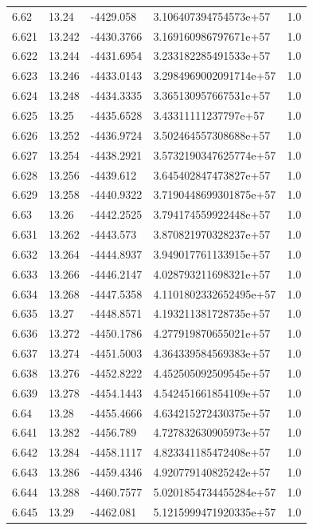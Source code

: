 \begin{tabular}{lllll}
6.62 & 13.24 & -4429.058 & 3.106407394754573e+57 & 1.0 \\
6.621 & 13.242 & -4430.3766 & 3.169160986797671e+57 & 1.0 \\
6.622 & 13.244 & -4431.6954 & 3.233182285491533e+57 & 1.0 \\
6.623 & 13.246 & -4433.0143 & 3.2984969002091714e+57 & 1.0 \\
6.624 & 13.248 & -4434.3335 & 3.365130957667531e+57 & 1.0 \\
6.625 & 13.25 & -4435.6528 & 3.43311111237797e+57 & 1.0 \\
6.626 & 13.252 & -4436.9724 & 3.502464557308688e+57 & 1.0 \\
6.627 & 13.254 & -4438.2921 & 3.5732190347625774e+57 & 1.0 \\
6.628 & 13.256 & -4439.612 & 3.645402847473827e+57 & 1.0 \\
6.629 & 13.258 & -4440.9322 & 3.7190448699301875e+57 & 1.0 \\
6.63 & 13.26 & -4442.2525 & 3.794174559922448e+57 & 1.0 \\
6.631 & 13.262 & -4443.573 & 3.870821970328237e+57 & 1.0 \\
6.632 & 13.264 & -4444.8937 & 3.949017761133915e+57 & 1.0 \\
6.633 & 13.266 & -4446.2147 & 4.028793211698321e+57 & 1.0 \\
6.634 & 13.268 & -4447.5358 & 4.1101802332652495e+57 & 1.0 \\
6.635 & 13.27 & -4448.8571 & 4.193211381728735e+57 & 1.0 \\
6.636 & 13.272 & -4450.1786 & 4.277919870655021e+57 & 1.0 \\
6.637 & 13.274 & -4451.5003 & 4.364339584569383e+57 & 1.0 \\
6.638 & 13.276 & -4452.8222 & 4.452505092509545e+57 & 1.0 \\
6.639 & 13.278 & -4454.1443 & 4.542451661854109e+57 & 1.0 \\
6.64 & 13.28 & -4455.4666 & 4.634215272430375e+57 & 1.0 \\
6.641 & 13.282 & -4456.789 & 4.727832630905973e+57 & 1.0 \\
6.642 & 13.284 & -4458.1117 & 4.823341185472408e+57 & 1.0 \\
6.643 & 13.286 & -4459.4346 & 4.920779140825242e+57 & 1.0 \\
6.644 & 13.288 & -4460.7577 & 5.0201854734455284e+57 & 1.0 \\
6.645 & 13.29 & -4462.081 & 5.1215999471920335e+57 & 1.0 \\

\end{tabular}
